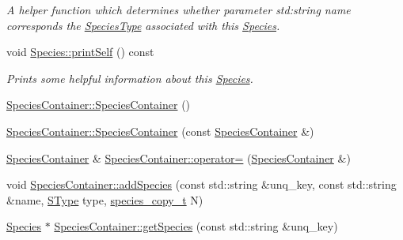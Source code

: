 \begin{DoxyCompactItemize}
\begin{DoxyCompactList}\small\item\em A helper function which determines whether parameter std\-:string name corresponds the \hyperlink{classSpeciesType}{Species\-Type} associated with this \hyperlink{classSpecies}{Species}. \end{DoxyCompactList}\item 
void \hyperlink{group__Chemistry_gad49f156d0ec606b5b11fd4ffa64e454d}{Species\-::print\-Self} () const 
\begin{DoxyCompactList}\small\item\em Prints some helpful information about this \hyperlink{classSpecies}{Species}. \end{DoxyCompactList}\item 
\hyperlink{group__Chemistry_gac505d1ddbf8783427c084d18eb568404}{Species\-Container\-::\-Species\-Container} ()
\item 
\hyperlink{group__Chemistry_gac472c110d61ce09f6b2c36aca27b42b9}{Species\-Container\-::\-Species\-Container} (const \hyperlink{classSpeciesContainer}{Species\-Container} \&)
\item 
\hyperlink{classSpeciesContainer}{Species\-Container} \& \hyperlink{group__Chemistry_ga6e248939edbee601bf6d6058ef68603c}{Species\-Container\-::operator=} (\hyperlink{classSpeciesContainer}{Species\-Container} \&)
\item 
void \hyperlink{group__Chemistry_ga80e58a9c06521c2bb7e4e89a1de4ac79}{Species\-Container\-::add\-Species} (const std\-::string \&unq\-\_\-key, const std\-::string \&name, \hyperlink{group__Chemistry_ga49104ff0a7d4118feb179c2f1c906f12}{S\-Type} type, \hyperlink{common_8h_a3503f321fd36304ee274141275cca586}{species\-\_\-copy\-\_\-t} N)
\item 
\hyperlink{classSpecies}{Species} $\ast$ \hyperlink{group__Chemistry_gaf4a162a1737e9434f27bab0210670127}{Species\-Container\-::get\-Species} (const std\-::string \&unq\-\_\-key)
\end{DoxyCompactItemize}
